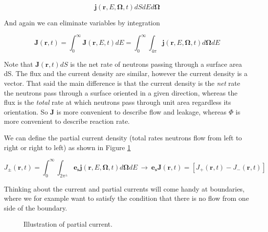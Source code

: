 $$\mathbf{j}(\mathbf{r},E,\mathbf{\Omega},t)dSdEd\mathbf{\Omega}$$

And again we can eliminate variables by integration

$$\mathbf{J}(\mathbf{r},t)=\int^\infty_0\mathbf{J}(\mathbf{r},E,t)dE=\int^\infty_0\int_{4\pi}\mathbf{j}(\mathbf{r},E,\mathbf{\Omega},t)d\mathbf{\Omega}dE$$

Note that $\mathbf{J}(\mathbf{r},t)dS$ is the net rate of neutrons passing through a surface area dS. The flux and the current density are similar, however the current density is a vector. That said the main difference is that the current density is the \textit{net} rate the neutrons pass through a surface oriented in a given direction, whereas the flux is the \textit{total} rate at which neutrons pass through unit area regardless its orientation. So $\mathbf{J}$ is more convenient to describe flow and leakage, whereas $\Phi$ is more convenient to describe reaction rate.

We can define the partial current density (total rates neutrons flow from left to right or right to left) as shown in Figure \ref{fig:partialcurrent}

$$J_\pm (\mathbf{r},t)=\int^\infty_0\int_{2\pi^\pm}\mathbf{e_s}\mathbf{j}(\mathbf{r},E,\mathbf{\Omega},t)d\mathbf{\Omega}dE \: \rightarrow \: \mathbf{e_s}\mathbf{J}(\mathbf{r},t)=[J_+(\mathbf{r},t)-J_-(\mathbf{r},t)]$$
 
Thinking about the current and partial currents will come handy at boundaries, where we for example want to satisfy the condition that there is no flow from one side of the boundary.

\begin{figure}[ht!]
\protect {}\protect
\caption{\label{fig:partialcurrent} \footnotesize{Illustration of partial current.}}
\end{figure} 

